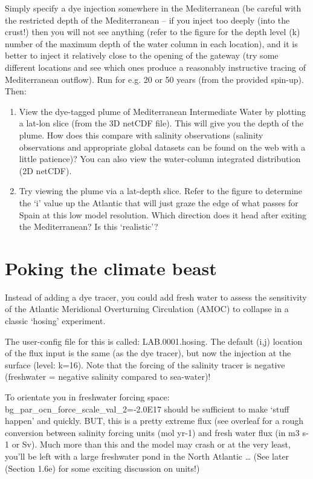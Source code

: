 \documentclass[11pt,fleqn]{book} %
\begin{document}
Simply specify a dye injection somewhere in the Mediterranean (be careful with the restricted depth of the Mediterranean – if you inject too deeply (into the crust!) then you will not see anything (refer to the figure for the depth level (k) number of the maximum depth of the water column in each location), and it is better to inject it relatively close to the opening of the gateway (try some different locations and see which ones produce a reasonably instructive tracing of Mediterranean outflow). Run for e.g. 20 or 50 years (from the provided spin-up). Then:

\begin{enumerate}[noitemsep]
\item View the dye-tagged plume of Mediterranean Intermediate Water by plotting a lat-lon slice (from the 3D netCDF file). This will give you the depth of the plume. How does this compare with salinity observations (salinity observations and appropriate global datasets can be found on the web with a little patience)? You can also view the water-column integrated distribution (2D netCDF).
\item Try viewing the plume via a lat-depth slice. Refer to the figure to determine the ‘i’ value up the Atlantic that will just graze the edge of what passes for Spain at this low model resolution. Which direction does it head after exiting the Mediterranean? Is this ‘realistic’?
\end{enumerate}


\newpage


\section{Poking the climate beast}

Instead of adding a dye tracer, you could add fresh water to assess the sensitivity of the Atlantic Meridional Overturning Circulation (AMOC) to collapse in a classic ‘hosing’ experiment.

The user-config file for this is called: LAB.0001.hosing. The default (i,j) location of the flux input is the same (as the dye tracer), but now the injection at the surface (level: k=16). Note that the forcing of the salinity tracer is negative (freshwater = negative salinity compared to sea-water)! 

To orientate you in freshwater forcing space: bg\_par\_ocn\_force\_scale\_val\_2=-2.0E17 should be sufficient to make ‘stuff happen’ and quickly. BUT, this is a pretty extreme flux (see overleaf for a rough conversion between salinity forcing units (mol yr-1) and fresh water flux (in m3 s-1 or Sv). Much more than this and the model may crash or at the very least, you’ll be left with a large freshwater pond in the North Atlantic … (See later (Section 1.6e) for some exciting discussion on units!)
\end{document}
